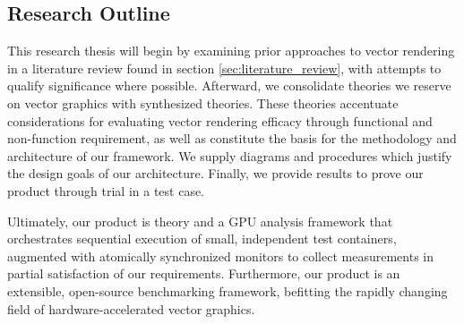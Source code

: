 \subsection{Research Outline}\label{sec:research_outline}
This research thesis will begin by examining prior approaches to vector rendering in a literature review found in section \cref{sec:literature_review}, with attempts to qualify significance where possible. Afterward, we consolidate theories we reserve on vector graphics with synthesized theories. These theories accentuate considerations for evaluating vector rendering efficacy through functional and non-function requirement, as well as constitute the basis for the methodology and architecture of our framework. We supply diagrams and procedures which justify the design goals of our architecture. Finally, we provide results to prove our product through trial in a test case.\medskip

Ultimately, our product is theory and a GPU analysis framework that orchestrates sequential execution of small, independent test containers, augmented with atomically synchronized monitors to collect measurements in partial satisfaction of our requirements. Furthermore, our product is an extensible, open-source benchmarking framework, befitting the rapidly changing field of hardware-accelerated vector graphics.